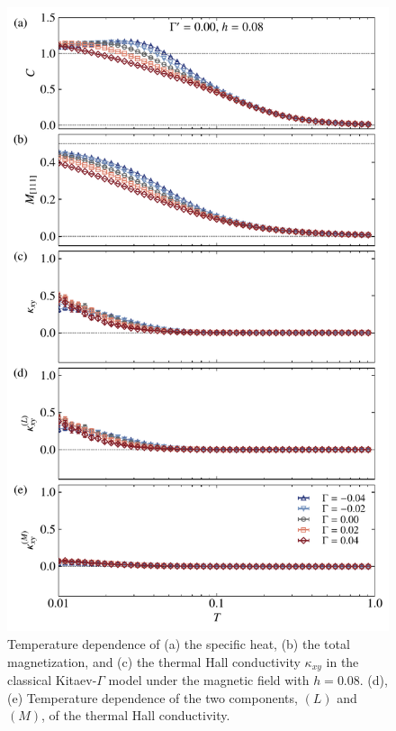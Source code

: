 \documentclass[reprint,amsmath,amssymb,aps,prx]{revtex4-2}
\begin{document}
\begin{figure}[tbh] 
\begin{center} 
\includegraphics[width=0.9\linewidth]{fig_K-1.0_Gp0.00_h0.08.pdf}
\vspace{-0.5cm} 
\caption{Temperature dependence of (a) the specific heat, (b) the total magnetization, and
(c) the thermal Hall conductivity $\kappa_{xy}$ in the classical Kitaev-$\Gamma$ model under the magnetic field with $h=0.08$.
(d),(e) Temperature dependence of the two components, $(L)$ and $(M)$, of the thermal Hall conductivity.}
\label{fig_classical_gdep008}
\end{center}
\end{figure}
  
\end{document}
